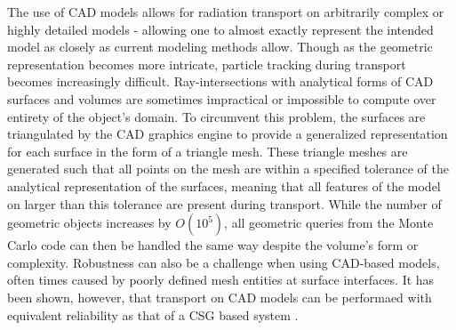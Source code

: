 \documentclass[12pt, a4paper]{article}
\begin{document}
The use of CAD models allows for radiation transport on arbitrarily complex or highly detailed models - allowing one to almost exactly represent the intended model as closely as current modeling methods allow. Though as the geometric representation becomes more intricate, particle tracking during transport becomes increasingly difficult. Ray-intersections with analytical forms of CAD surfaces and volumes are sometimes impractical or impossible to compute over entirety of the object's domain. To circumvent this problem, the surfaces are triangulated by the CAD graphics engine to provide a generalized representation for each surface in the form of a triangle mesh. These triangle meshes are generated such that all points on the mesh are within a specified tolerance of the analytical representation of the surfaces, meaning that all features of the model on larger than this tolerance are present during transport. While the number of geometric objects increases by $O(10^5)$, all geometric queries from the Monte Carlo code can then be handled the same way despite the volume's form or complexity. Robustness can also be a challenge when using CAD-based models, often times caused by poorly defined mesh entities at surface interfaces. It has been shown, however, that transport on CAD models can be performaed with equivalent reliability as that of a CSG based system \cite{Smith_2011}.
\end{document}

